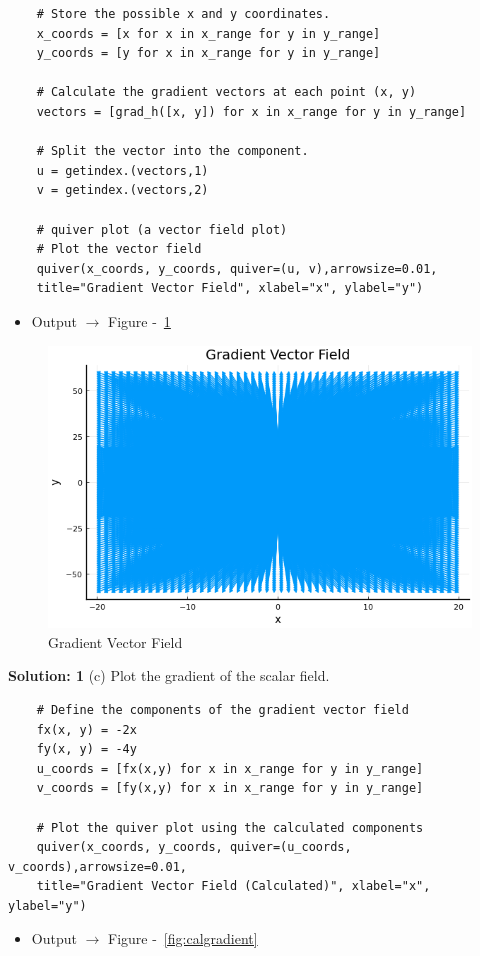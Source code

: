\documentclass{homework}
\begin{document}
\begin{solution}
\begin{verbatim}
    # Store the possible x and y coordinates.
    x_coords = [x for x in x_range for y in y_range]
    y_coords = [y for x in x_range for y in y_range]

    # Calculate the gradient vectors at each point (x, y)
    vectors = [grad_h([x, y]) for x in x_range for y in y_range]

    # Split the vector into the component.
    u = getindex.(vectors,1)
    v = getindex.(vectors,2)

    # quiver plot (a vector field plot)
    # Plot the vector field
    quiver(x_coords, y_coords, quiver=(u, v),arrowsize=0.01,
    title="Gradient Vector Field", xlabel="x", ylabel="y")
    \end{verbatim}
    
    \begin{itemize}
        \item Output $\rightarrow$ Figure -~\ref{fig:autogradient}
    \end{itemize}
    
    \begin{figure}[H]
        \centering
        \includegraphics[width=0.5\linewidth]{media/gradientauto.png}
        \caption{Gradient Vector Field}
        \label{fig:autogradient}
    \end{figure} 
    
    \textbf{Solution: 1}
    (c)  Plot the gradient of the scalar field.
    \begin{verbatim}
    # Define the components of the gradient vector field
    fx(x, y) = -2x
    fy(x, y) = -4y
    u_coords = [fx(x,y) for x in x_range for y in y_range]
    v_coords = [fy(x,y) for x in x_range for y in y_range]
    
    # Plot the quiver plot using the calculated components
    quiver(x_coords, y_coords, quiver=(u_coords, v_coords),arrowsize=0.01,
    title="Gradient Vector Field (Calculated)", xlabel="x", ylabel="y")
    \end{verbatim}
    
    \begin{itemize}
        \item Output $\rightarrow$ Figure -~\ref{fig:calgradient}
    \end{itemize}
    

\end{solution}
\end{document}

